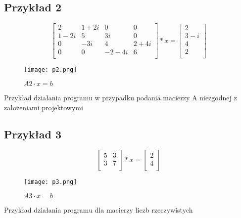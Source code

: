 \documentclass{article}
\begin{document}
\subsection*{Przykład 2}
\vspace{12pt}
\[\begin{bmatrix}
    2 & 1 + 2i & 0 & 0 \\
    1 - 2i & 5 & 3i & 0 \\
    0 & -3i & 4 & 2 + 4i \\
    0 & 0 & -2 - 4i & 6\\
\end{bmatrix} * x = 
\begin{bmatrix} 2\\ 3-i \\ 4 \\ 2 \\
\end{bmatrix}
 \]

\begin{figure}[hbt!]
  \centering
    \texttt{[image: p2.png]}
    \caption{$A2 \cdot x = b$}
    \label{fig:example}
\end{figure}

Przykład działania programu w przypadku podania macierzy A niezgodnej z założeniami projektowymi

\subsection*{Przykład 3}
\vspace{12pt}
\[\begin{bmatrix}
    5 & 3 \\
    3 & 7 \\
\end{bmatrix} * x = 
\begin{bmatrix} 2 \\ 4 \\
\end{bmatrix}
 \]

\begin{figure}[hbt!]
  \centering
    \texttt{[image: p3.png]}
    \caption{$A3 \cdot x = b$}
    \label{fig:example}
\end{figure}

Przykład działania programu dla macierzy liczb rzeczywistych
\end{document}
